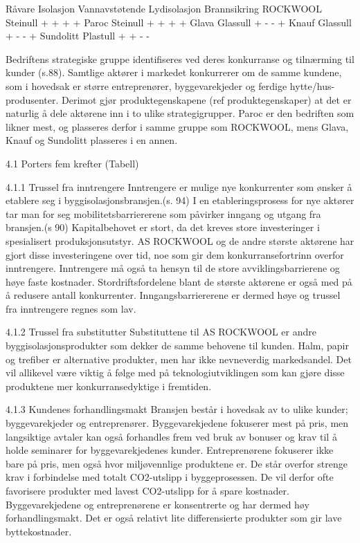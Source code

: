 Råvare
Isolasjon
Vannavstøtende
Lydisolasjon
Brannsikring
ROCKWOOL
Steinull
+
+
+
+
Paroc
Steinull
+
+
+
+
Glava
Glassull
+
-
-
+
Knauf
Glassull
+
-
-
+
Sundolitt
Plastull
+
+
-
-


Bedriftens strategiske gruppe identifiseres ved deres konkurranse og tilnærming til kunder (s.88). Samtlige aktører i markedet konkurrerer om de samme kundene, som i hovedsak er større entreprenører, byggevarekjeder og ferdige hytte/hus-produsenter. Derimot gjør produktegenskapene (ref produktegenskaper) at det er naturlig å dele aktørene inn i to ulike strategigrupper. Paroc er den bedriften som likner mest, og plasseres derfor i samme gruppe som ROCKWOOL, mens Glava, Knauf og Sundolitt plasseres i en annen. 
 
4.1 Porters fem krefter
(Tabell)

4.1.1 Trussel fra inntrengere
Inntrengere er mulige nye konkurrenter som ønsker å etablere seg i byggisolasjonsbransjen.(s. 94) I en etableringsprosess for nye aktører tar man for seg mobilitetsbarriererene som påvirker inngang og utgang fra bransjen.(s 90) Kapitalbehovet er stort, da det kreves store investeringer i spesialisert produksjonsutstyr. AS ROCKWOOL og de andre største aktørene  har gjort disse investeringene over tid, noe som gir dem konkurransefortrinn overfor inntrengere. Inntrengere må også ta hensyn til de store avviklingsbarrierene og høye faste kostnader. Stordriftsfordelene blant de største aktørene er også med på å redusere antall konkurrenter. Inngangsbarriererene er dermed høye og trussel fra inntrengere regnes som lav.
 
4.1.2 Trussel fra substitutter
Substituttene til AS ROCKWOOL er andre byggisolasjonsprodukter som dekker de samme behovene til kunden. Halm, papir og trefiber er alternative produkter, men har ikke nevneverdig markedsandel. Det vil allikevel være viktig å følge med på teknologiutviklingen som kan gjøre disse produktene mer konkurransedyktige i fremtiden.

4.1.3 Kundenes forhandlingsmakt
Bransjen består i hovedsak av to ulike kunder; byggevarekjeder og entreprenører. Byggevarekjedene fokuserer mest på pris, men langsiktige avtaler kan også forhandles frem ved bruk av bonuser og krav til å holde seminarer for byggevarekjedenes kunder. Entreprenørene fokuserer ikke bare på pris, men også hvor miljøvennlige produktene er. De står overfor strenge krav i forbindelse med totalt CO2-utslipp i byggeprosessen. De vil derfor ofte favorisere produkter med lavest CO2-utslipp for å spare kostnader.
 Byggevarekjedene og entreprenørene er konsentrerte og har dermed høy forhandlingsmakt. Det er også relativt lite differensierte produkter som gir lave byttekostnader. 


